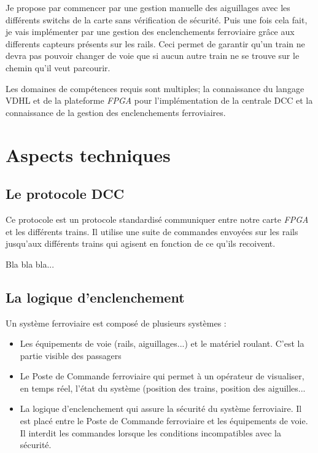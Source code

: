 Je propose par commencer par une gestion manuelle des aiguillages avec
les différents switchs de la carte sans vérification de sécurité. Puis
une fois cela fait, je vais implémenter par une gestion des
enclenchements ferroviaire grâce aux differents capteurs présents sur
les rails. Ceci permet de garantir qu'un train ne devra pas pouvoir
changer de voie que si aucun autre train ne se trouve sur le chemin
qu'il veut parcourir. 

Les domaines de compétences requis sont multiples; la connaissance
du langage VDHL et de la plateforme \emph{FPGA} pour l'implémentation
de la centrale DCC et la connaissance de la gestion des enclenchements
ferroviaires.


\newpage
\section{Aspects techniques}
\label{sec:asp_tech}

\subsection{Le protocole DCC}
\label{sec:dcc}
Ce protocole est un protocole standardisé  communiquer entre notre carte
\emph{FPGA} et les différents trains. Il utilise une suite de commandes envoyées sur les rails  
jusqu'aux différents trains qui agisent en fonction de ce qu'ils recoivent.

Bla bla bla...

\subsection{La logique d'enclenchement}
\label{sec:log_ixl}

Un système ferroviaire est composé de plusieurs systèmes :
\begin{itemize}
  \item Les équipements de voie (rails, aiguillages...) et le matériel
    roulant. C'est la partie visible des passagers
  \item Le Poste de Commande ferroviaire qui permet à un opérateur de
    visualiser, en temps réel, l'état du système (position des trains,
    position des aiguilles...
  \item La logique d'enclenchement qui assure la sécurité du système
    ferroviaire. Il est placé entre le Poste de Commande ferroviaire
    et les équipements de voie. Il interdit les commandes lorsque les
    conditions incompatibles avec la sécurité. 
\end{itemize}

